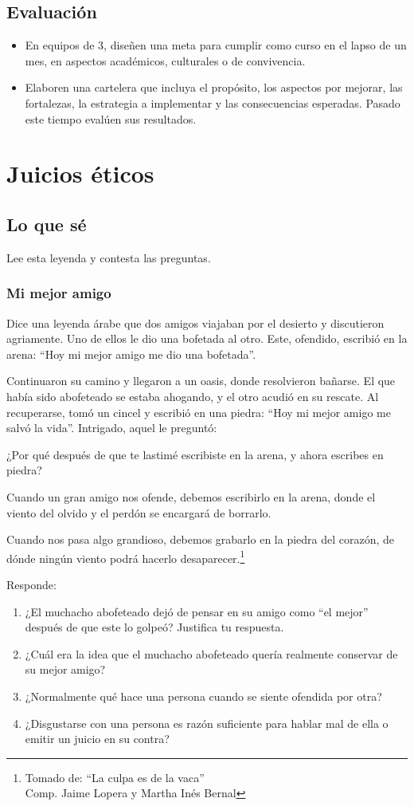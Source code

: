 \documentclass[10pt,twoside]{article}
\begin{document}
\subsection*{Evaluación}
\begin{itemize}
 \item En equipos de 3, diseñen una meta para cumplir como curso en el lapso de un mes, en aspectos académicos, culturales o de convivencia.
\item Elaboren una cartelera que incluya el propósito, los aspectos por mejorar, las fortalezas, la estrategia a implementar y las consecuencias esperadas. Pasado este tiempo evalúen sus resultados.
\end{itemize}
\section*{Juicios éticos}
\subsection*{Lo que sé}
 Lee esta leyenda y contesta las preguntas.
\subsubsection*{Mi mejor amigo}
Dice una leyenda árabe que dos amigos viajaban por el desierto y discutieron agriamente. Uno de ellos le dio una bofetada al otro. Este, ofendido, escribió en la arena: “Hoy mi mejor amigo me dio una bofetada”.

Continuaron su camino y llegaron a un oasis, donde resolvieron bañarse. El que había sido abofeteado se estaba ahogando, y el otro acudió en su rescate. Al recuperarse, tomó un cincel y escribió en una piedra: “Hoy mi mejor amigo me salvó la vida”. Intrigado, aquel le preguntó:

¿Por qué después de que te lastimé escribiste en la arena, y ahora escribes en piedra?

Cuando un gran amigo nos ofende, debemos escribirlo en la arena, donde el viento del olvido y el perdón se encargará de borrarlo.

Cuando nos pasa algo grandioso, debemos grabarlo en la piedra del corazón, de dónde ningún viento podrá hacerlo desaparecer.\footnote{Tomado de: ``La culpa es de la vaca''\\Comp. Jaime Lopera y Martha Inés Bernal}

Responde:
\begin{enumerate}
 \item ¿El muchacho abofeteado dejó de pensar en su amigo como “el mejor” después de que este lo golpeó? Justifica tu respuesta.
 \item ¿Cuál era la idea que el muchacho abofeteado quería realmente conservar de su mejor amigo?
 \item ¿Normalmente qué hace una persona cuando se siente ofendida por otra?
 \item ¿Disgustarse con una persona es razón suficiente para hablar mal de ella o emitir un juicio en su contra?
\end{enumerate}
\end{document}
